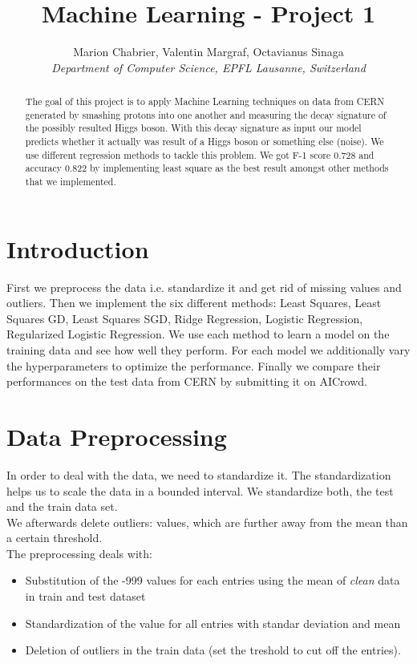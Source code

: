 \documentclass[10pt,conference,compsocconf]{IEEEtran}
\begin{document}
\title{Machine Learning - Project 1}

\author{
  Marion Chabrier, Valentin Margraf, Octavianus Sinaga\\
  \textit{Department of Computer Science, EPFL Lausanne, Switzerland}
}

\maketitle

\begin{abstract}
The goal of this project is to apply Machine Learning techniques on data from CERN generated by smashing protons into one another and measuring the decay signature of the possibly resulted Higgs boson. With this decay signature as input our model predicts whether it actually was result of a Higgs boson or something else (noise). We use different regression methods to tackle this problem. We got F-1 score 0.728 and accuracy 0.822 by implementing least square as the best result amongst other methods that we implemented.
\end{abstract}

\section{Introduction}
First we preprocess the data i.e. standardize it and get rid of missing values and outliers.
Then we implement the six different methods: Least Squares, Least Squares GD, Least Squares SGD, Ridge Regression, Logistic Regression, Regularized Logistic Regression. We use each method to learn a model on the training data and see how well they perform. For each model we additionally vary the hyperparameters to optimize the performance. Finally we compare their performances on the test data from CERN by submitting it on AICrowd.



\section{Data Preprocessing}
\label{sec:prepro}
In order to deal with the data, we need to standardize it. The standardization helps us to scale the data in a bounded interval. We standardize both, the test and the train data set. \\
We afterwards delete outliers: values, which are further away from the mean than a certain threshold. 
\\
The preprocessing deals with:
\begin{itemize}
	\item Substitution of the -999 values for each entries using the mean of \textit{clean} data in train and test dataset
	\item Standardization of the value for all entries with standar deviation and mean
	\item Deletion of outliers in the train data (set the treshold to cut off the entries).
\end{itemize}
\end{document}
